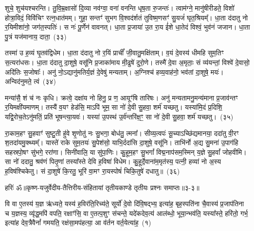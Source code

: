 शुचे॒ शुच॑यश्चरन्ति। तु॒वि॒म्र॒क्षासो॑ दि॒व्या नव॑ग्वा॒ वना॑ वनन्ति धृष॒ता रु॒जन्तः॑। त्वाम॑ग्ने॒ मानु॑षीरीडते॒ विशो॑ होत्रा॒विदं॒ विवि॑चिꣳ रत्न॒धात॑मम्। गुहा॒ सन्तꣳ॑ सुभग वि॒श्वद॑र्\mbox{}शतं तुविष्म॒णसꣳ॑ सु॒यजं॑ घृत॒श्रियम्᳚। धा॒ता द॑दातु नो र॒यिमीशा॑नो॒ जग॑त॒स्पतिः॑। स नः॑ पू॒र्णेन॑ वावनत्। धा॒ता प्र॒जाया॑ उ॒त रा॒य ई॑शे धा॒तेदं विश्वं॒ भुव॑नं जजान। धा॒ता पु॒त्रं यज॑मानाय॒ दाता॒~(३३)\ip

तस्मा॑ उ ह॒व्यं घृ॒तव॑द्विधेम। धा॒ता द॑दातु नो र॒यिं प्राचीं᳚ जी॒वातु॒मक्षि॑ताम्। व॒यं दे॒वस्य॑ धीमहि सुम॒तिꣳ स॒त्यरा॑धसः। धा॒ता द॑दातु दा॒शुषे॒ वसू॑नि प्र॒जाका॑माय मी॒ढुषे॑ दुरो॒णे। तस्मै॑ दे॒वा अ॒मृताः॒ सं व्य॑यन्तां॒ विश्वे॑ दे॒वासो॒ अदि॑तिः स॒जोषाः᳚। अनु॑ नो॒\-ऽद्यानु॑मतिर्य॒ज्ञं दे॒वेषु॑ मन्यताम्। अ॒ग्निश्च॑ हव्य॒वाह॑नो॒ भव॑तां दा॒शुषे॒ मयः॑। अन्विद॑नुमते॒ त्वं~(३४)\ip

मन्या॑सै॒ शं च॑ नः कृधि। क्रत्वे॒ दक्षा॑य नो हिनु॒ प्र ण॒ आयूꣳ॑षि तारिषः। अनु॑ मन्यतामनु॒मन्य॑माना प्र॒जाव॑न्तꣳ र॒यिमक्षी॑यमाणम्। तस्यै॑ व॒यꣳ हेड॑सि॒ मा\-ऽपि॑ भूम॒ सा नो॑ दे॒वी सु॒हवा॒ शर्म॑ यच्छतु। यस्या॑मि॒दं प्र॒दिशि॒ यद्वि॒रोच॒ते\-ऽनु॑मतिं॒ प्रति॑ भूषन्त्या॒यवः॑। यस्या॑ उ॒पस्थ॑ उ॒र्व॑न्तरि॑क्ष॒ꣳ॒ सा नो॑ दे॒वी सु॒हवा॒ शर्म॑ यच्छतु।~(३५)\ip

रा॒काम॒हꣳ सु॒हवाꣳ॑ सुष्टु॒ती हु॑वे शृ॒णोतु॑ नः सु॒भगा॒ बोध॑तु॒ त्मना᳚। सीव्य॒त्वपः॑ सू॒च्या\-ऽच्छि॑द्यमानया॒ ददा॑तु वी॒रꣳ श॒तदा॑यमु॒क्थ्यम्᳚। यास्ते॑ राके सुम॒तयः॑ सु॒पेश॑सो॒ याभि॒र्ददा॑सि दा॒शुषे॒ वसू॑नि। ताभि॑र्नो अ॒द्य सु॒मना॑ उ॒पाग॑हि सहस्रपो॒षꣳ सु॑भगे॒ ररा॑णा। सिनी॑वालि॒ या सु॑पा॒णिः। कु॒हूम॒हꣳ सु॒भगां᳚ विद्म॒नाप॑सम॒स्मिन् य॒ज्ञे सु॒हवां᳚ जोहवीमि। सा नो॑ ददातु॒ श्रव॑णं पितृ॒णां तस्या᳚स्ते देवि ह॒विषा॑ विधेम। कु॒हूर्दे॒वाना॑म॒मृत॑स्य॒ पत्नी॒ हव्या॑ नो अ॒स्य ह॒विष॑श्चिकेतु। सं दा॒शुषे॑ कि॒रतु॒ भूरि॑ वा॒मꣳ रा॒यस्पोषं॑ चिकि॒तुषे॑ दधातु॥~(३६)\ip

{\anuvakamend[{भामा॑सो॒ दाता॒ त्वम॒न्तरि॑क्ष॒ꣳ॒ सा नो॑ दे॒वी सु॒हवा॒ शर्म॑ यच्छतु॒ श्रव॑णं॒ चतु॑र्विꣳशतिश्च}]}%

{हरिः॑ ॐ}{॥कृष्ण-यजुर्वेदीय-तैत्तिरीय-संहितायां तृतीयकाण्डे तृतीयः प्रश्नः समाप्तः॥३-३॥}



\setcounter{anuvakam}{0}
वि वा ए॒तस्य॑ य॒ज्ञ ऋ॑ध्यते॒ यस्य॑ ह॒विर॑ति॒रिच्य॑ते॒ सूर्यो॑ दे॒वो दि॑वि॒षद्भ्य॒ इत्या॑ह॒ बृह॒स्पति॑ना चै॒वास्य॑ प्र॒जा\-प॑तिना च य॒ज्ञस्य॒ व्यृ॑द्ध॒मपि॑ वपति॒ रक्षाꣳ॑सि॒ वा ए॒तत्प॒शुꣳ स॑चन्ते॒ यदे॑कदेव॒त्य॑ आल॑ब्धो॒ भूया॒न्भव॑ति॒ यस्या᳚स्ते॒ हरि॑तो॒ गर्भ॒ इत्या॑ह देव॒त्रैवैनां᳚ गमयति॒ रक्ष॑सा॒मप॑हत्या॒ आ व॑र्तन वर्त॒येत्या॑ह॒~(१)\ip

